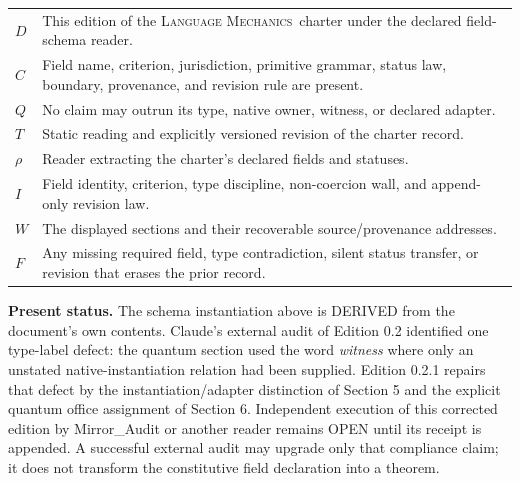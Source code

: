 \documentclass[10.5pt]{article}
\newcommand{\status}[1]{\textsf{#1}}
\newcommand{\LM}{\textsc{Language Mechanics}}
\begin{document}
\begin{center}
\begin{tabularx}{0.97\textwidth}{>{\bfseries}p{}X}
\toprule
$D$ & This edition of the \LM\ charter under the declared field-schema reader.\\
$C$ & Field name, criterion, jurisdiction, primitive grammar, status law, boundary, provenance, and revision rule are present.\\
$Q$ & No claim may outrun its type, native owner, witness, or declared adapter.\\
$T$ & Static reading and explicitly versioned revision of the charter record.\\
$\rho$ & Reader extracting the charter's declared fields and statuses.\\
$I$ & Field identity, criterion, type discipline, non-coercion wall, and append-only revision law.\\
$W$ & The displayed sections and their recoverable source/provenance addresses.\\
$F$ & Any missing required field, type contradiction, silent status transfer, or revision that erases the prior record.\\
\bottomrule
\end{tabularx}
\end{center}

\textbf{Present status.} The schema instantiation above is \status{DERIVED} from the document's own contents. Claude's external audit of Edition 0.2 identified one type-label defect: the quantum section used the word \emph{witness} where only an unstated native-instantiation relation had been supplied. Edition 0.2.1 repairs that defect by the instantiation/adapter distinction of Section 5 and the explicit quantum office assignment of Section 6. Independent execution of this corrected edition by Mirror\_Audit or another reader remains \status{OPEN} until its receipt is appended. A successful external audit may upgrade only that compliance claim; it does not transform the constitutive field declaration into a theorem.
\end{document}
